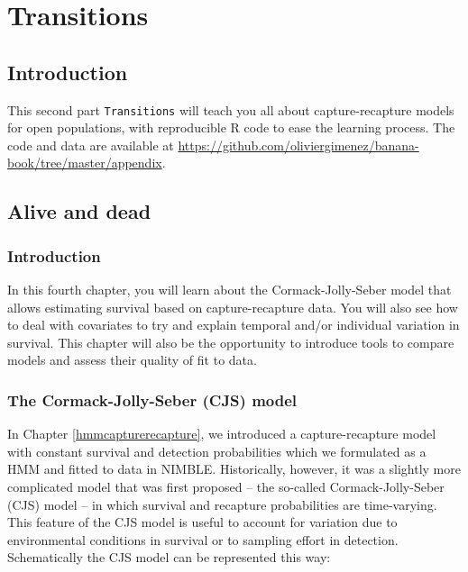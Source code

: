 \documentclass[
  12pt,
]{krantz}
\begin{document}
\part{Transitions}\label{part-transitions}

\chapter*{Introduction}\label{introduction-4}


This second part \texttt{Transitions} will teach you all about capture-recapture models for open populations, with reproducible R code to ease the learning process. The code and data are available at \url{https://github.com/oliviergimenez/banana-book/tree/master/appendix}.

\chapter{Alive and dead}\label{survival}

\section{Introduction}\label{introduction-5}

In this fourth chapter, you will learn about the Cormack-Jolly-Seber model that allows estimating survival based on capture-recapture data. You will also see how to deal with covariates to try and explain temporal and/or individual variation in survival. This chapter will also be the opportunity to introduce tools to compare models and assess their quality of fit to data.

\section{The Cormack-Jolly-Seber (CJS) model}\label{the-cormack-jolly-seber-cjs-model}

In Chapter \ref{hmmcapturerecapture}, we introduced a capture-recapture model with constant survival and detection probabilities which we formulated as a HMM and fitted to data in NIMBLE. Historically, however, it was a slightly more complicated model that was first proposed -- the so-called Cormack-Jolly-Seber (CJS) model -- in which survival and recapture probabilities are time-varying. This feature of the CJS model is useful to account for variation due to environmental conditions in survival or to sampling effort in detection. Schematically the CJS model can be represented this way:
\end{document}
